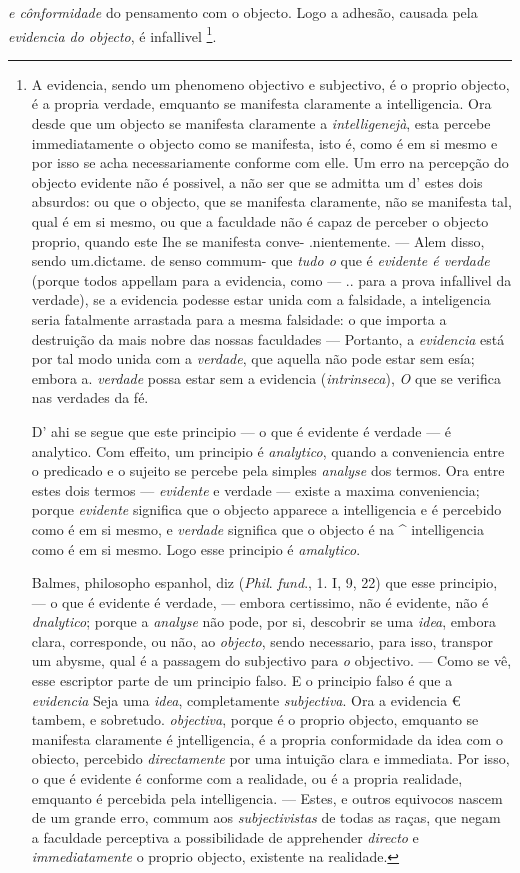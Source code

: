 \emph{e cônformidade} do pensamento com o objecto. Logo a adhesão, causada pela \emph{evidencia do objecto}, é infallivel \footnote{A evidencia, sendo um phenomeno objectivo e subjectivo, é o proprio objecto, é a propria verdade, emquanto se manifesta claramente a intelligencia. Ora desde que um objecto se manifesta claramente a \emph{intelligenejà}, esta percebe immediatamente o objecto como se manifesta, isto é, como é em si mesmo e por isso se acha necessariamente conforme com elle. Um erro na percepção do objecto evidente não é possivel, a não ser que se admitta um d' estes dois absurdos: ou que o objecto, que se manifesta claramente, não se manifesta tal, qual é em si mesmo, ou que a faculdade não é capaz de perceber o objecto proprio, quando este Ihe se manifesta conve- .nientemente. --- Alem disso, sendo um.dictame. de senso commum- que \emph{tudo o} que é \emph{evidente é verdade} (porque todos appellam para a evidencia, como --- .. para a prova infallivel da verdade), se a evidencia podesse estar unida com a falsidade, a inteligencia seria fatalmente arrastada para a mesma falsidade: o que importa a destruição da mais nobre das nossas faculdades --- Portanto, a \emph{evidencia} está por tal modo unida com a \emph{verdade}, que aquella não pode estar sem esía; embora a. \emph{verdade} possa estar sem a evidencia (\emph{intrinseca}), \emph{O} que se verifica nas verdades da fé.\par D' ahi se segue que este principio --- o que é evidente é verdade --- é analytico. Com effeito, um principio é \emph{analytico}, quando a conveniencia entre o predicado e o sujeito se percebe pela simples \emph{analyse} dos termos. Ora entre estes dois termos --- \emph{evidente} e verdade --- existe a maxima conveniencia; porque \emph{evidente} significa que o objecto apparece a intelligencia e é percebido como é em si mesmo, e \emph{verdade} significa que o objecto é na \textasciicircum{} intelligencia como é em si mesmo. Logo esse principio é \emph{amalytico}.\par Balmes, philosopho espanhol, diz (\emph{Phil}. \emph{fund}., 1. I, 9, 22) que esse principio, --- o que é evidente é verdade, --- embora certissimo, não é evidente, não é \emph{dnalytico}; porque a \emph{analyse} não pode, por si, descobrir se uma \emph{idea}, embora clara, corresponde, ou não, ao \emph{objecto}, sendo necessario, para isso, transpor um abysme, qual é a passagem do subjectivo para \emph{o} objectivo. --- Como se vê, esse escriptor parte de um principio falso. E o principio falso é que a \emph{evidencia} Seja uma \emph{idea}, completamente \emph{subjectiva}. Ora a evidencia € tambem, e sobretudo. \emph{objectiva}, porque é o proprio objecto, emquanto se manifesta claramente é jntelligencia, é a propria conformidade da idea com o obiecto, percebido \emph{directamente} por uma intuição clara e immediata. Por isso, o que é evidente é conforme com a realidade, ou é a propria realidade, emquanto é percebida pela intelligencia. --- Estes, e outros equivocos nascem de um grande erro, commum aos \emph{subjectivistas} de todas as raças, que negam a faculdade perceptiva a possibilidade de apprehender \emph{directo} e \emph{immediatamente} o proprio objecto, existente na realidade.}.

